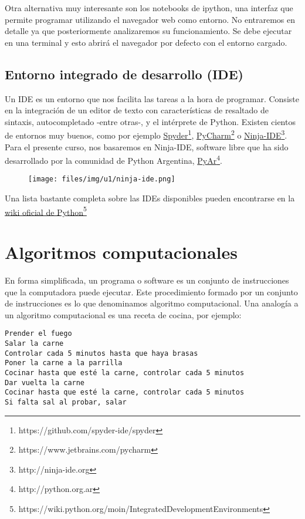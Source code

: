 \documentclass[a4paper,12pt,spanish]{sphinxmanual}
\begin{document}
Otra alternativa muy interesante son los notebooks de ipython, una
interfaz que permite programar utilizando el navegador web como entorno.
No entraremos en detalle ya que posteriormente analizaremos su
funcionamiento. Se debe ejecutar en una terminal  y
esto abrirá el navegador por defecto con el entorno cargado.


\subsection{Entorno integrado de desarrollo (IDE)}
\label{Unidad01:entorno-integrado-de-desarrollo-ide}
Un IDE es un entorno que nos facilita las tareas a la hora de programar.
Consiste en la integración de un editor de texto con características de
resaltado de sintaxis, autocompletado -entre otras-, y el intérprete de
Python. Existen cientos de entornos muy buenos, como por ejemplo
\href{https://github.com/spyder-ide/spyder}{Spyder}\footnote{https://github.com/spyder-ide/spyder},
\href{https://www.jetbrains.com/pycharm}{PyCharm}\footnote{https://www.jetbrains.com/pycharm} o
\href{http://ninja-ide.org}{Ninja-IDE}\footnote{http://ninja-ide.org}. Para el presente curso, nos
basaremos en Ninja-IDE, software libre que ha sido desarrollado por la
comunidad de Python Argentina, \href{http://python.org.ar}{PyAr}\footnote{http://python.org.ar}.
\begin{figure}[htbp]
\centering

\texttt{[image: files/img/u1/ninja-ide.png]}
\end{figure}

Una lista bastante completa sobre las IDEs disponibles pueden
encontrarse en la \href{https://wiki.python.org/moin/IntegratedDevelopmentEnvironments}{wiki oficial de
Python}\footnote{https://wiki.python.org/moin/IntegratedDevelopmentEnvironments}


\section{Algoritmos computacionales}
\label{Unidad01:algoritmos-computacionales}
En forma simplificada, un programa o software es un conjunto de
instrucciones que la computadora puede ejecutar. Este procedimiento
formado por un conjunto de instrucciones es lo que denominamos algoritmo
computacional. Una analogía a un algoritmo computacional es una receta
de cocina, por ejemplo:

\begin{Verbatim}[commandchars=\\\{\}]
Prender el fuego
Salar la carne
Controlar cada 5 minutos hasta que haya brasas
Poner la carne a la parrilla
Cocinar hasta que esté la carne, controlar cada 5 minutos
Dar vuelta la carne
Cocinar hasta que esté la carne, controlar cada 5 minutos
Si falta sal al probar, salar
\end{Verbatim}
\end{document}
